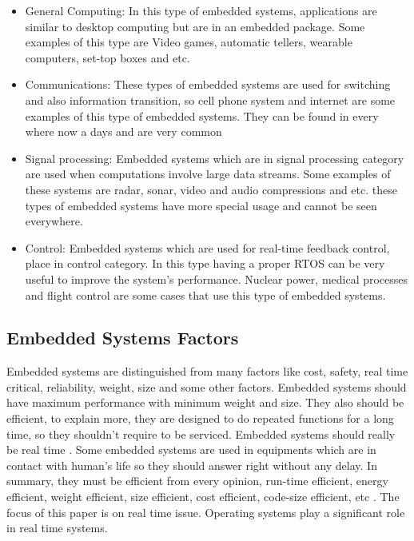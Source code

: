 \documentclass[12pt]{article}
\begin{document}
\begin{itemize}

	\item General Computing: In this type of embedded systems, applications are similar to desktop computing but are in an embedded package.
Some examples of this type are Video games, automatic tellers, wearable computers, set-top boxes and etc.	
	\item Communications: These types of embedded systems are used for switching and also information transition, so cell phone system and
internet are some examples of this type of embedded systems. They can be found in every where now a days and are very common
	\item Signal processing: Embedded systems which are in signal processing category are used when computations involve large data streams.
Some examples of these systems are radar, sonar, video and audio compressions and etc. these types of embedded systems have more
special usage and cannot be seen everywhere. 
	\item Control: Embedded systems which are used for real-time feedback control, place in control category. In this type having a proper
RTOS can be very useful to improve the system’s performance. Nuclear power, medical processes and flight control are some cases
that use this type of embedded systems.
	
\end{itemize}

\subsection{Embedded Systems Factors}
Embedded systems are distinguished from many factors like cost, safety, real time critical, reliability, weight, size and some other factors.
Embedded systems should have maximum performance with minimum weight and size. They also should be efficient, to explain more, they are
designed to do repeated functions for a long time, so they shouldn’t require to be serviced. Embedded systems should really be real time \cite{ref:eight}.
Some embedded systems are used in equipments which are in contact with human’s life so they should answer right without any delay. In
summary, they must be efficient from every opinion, run-time efficient, energy efficient, weight efficient, size efficient, cost efficient, code-size
efficient, etc . The focus of this paper is on real time issue. Operating systems play a significant role in real time systems.
\end{document}
